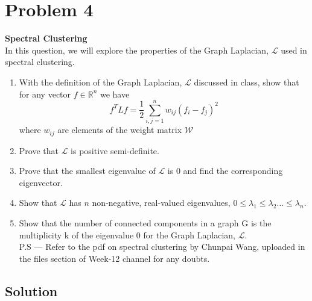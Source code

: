 \section*{Problem 4}

\textbf{Spectral Clustering}\\
In this question, we will explore the properties of the Graph Laplacian, \( \mathcal{L} \) used in spectral clustering.

\begin{enumerate}[label= (\alph*), noitemsep, topsep=0pt]
    \item With the definition of the Graph Laplacian, \( \mathcal{L} \) discussed in class, show that for any vector \( f \in \mathbb{R}^{n} \) we have
          \[
              f^{T} L f=\frac{1}{2} \sum_{i, j=1}^{n} w_{i j}\left(f_{i}-f_{j}\right)^{2}
          \]
          where \( w_{i j} \) are elements of the weight matrix \( \mathcal{W} \)

    \item Prove that \( \mathcal{L} \) is positive semi-definite.

    \item Prove that the smallest eigenvalue of \( \mathcal{L} \) is 0 and find the corresponding eigenvector.

    \item Show that \( \mathcal{L} \) has \( n \) non-negative, real-valued eigenvalues, \( 0 \leq \lambda_{1} \leq \lambda_{2} \ldots \leq \lambda_{n} \).

    \item Show that the number of connected components in a graph G is the multiplicity k of the eigenvalue 0 for the Graph Laplacian, \( \mathcal{L} \).\\
          P.S --- Refer to the pdf on spectral clustering by Chunpai Wang, uploaded in the files section of Week-12 channel for any doubts.
\end{enumerate}

\subsection*{Solution}
